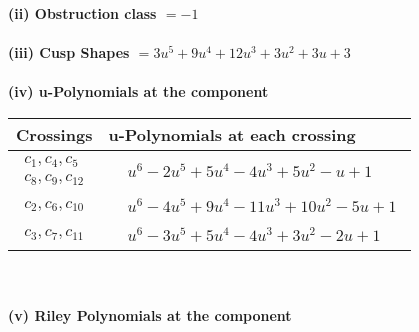 \documentclass[1p]{elsarticle_modified}
\theoremstyle{definition}
\begin{document}
\flushleft \textbf{(ii) Obstruction class $= -1$}\\~\\
\flushleft \textbf{(iii) Cusp Shapes $= 3 u^5+9 u^4+12 u^3+3 u^2+3 u+3$}\\~\\
\newpage\renewcommand{\arraystretch}{1}
\flushleft \textbf{(iv) u-Polynomials at the component}\newline \\
\begin{tabular}{m{50pt}|m{274pt}}
Crossings & \hspace{64pt}u-Polynomials at each crossing \\
\hline $$\begin{aligned}c_{1},c_{4},c_{5}\\c_{8},c_{9},c_{12}\end{aligned}$$&$\begin{aligned}
&u^6-2 u^5+5 u^4-4 u^3+5 u^2- u+1
\end{aligned}$\\
\hline $$\begin{aligned}c_{2},c_{6},c_{10}\end{aligned}$$&$\begin{aligned}
&u^6-4 u^5+9 u^4-11 u^3+10 u^2-5 u+1
\end{aligned}$\\
\hline $$\begin{aligned}c_{3},c_{7},c_{11}\end{aligned}$$&$\begin{aligned}
&u^6-3 u^5+5 u^4-4 u^3+3 u^2-2 u+1
\end{aligned}$\\
\hline
\end{tabular}\\~\\
\newpage\renewcommand{\arraystretch}{1}
\flushleft \textbf{(v) Riley Polynomials at the component}\newline \\
\end{document}

